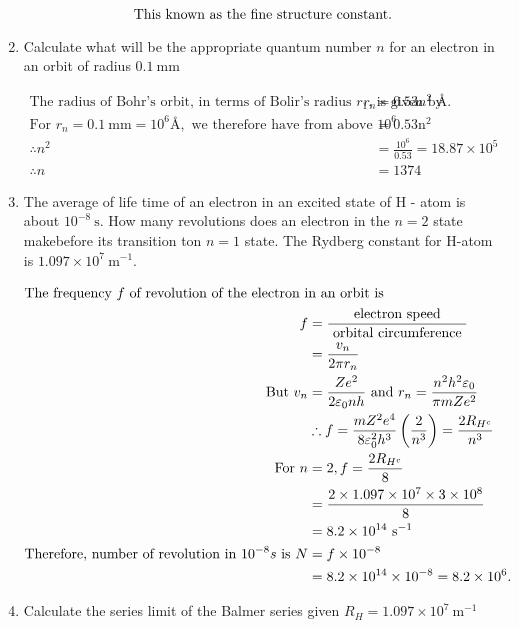\begin{enumerate}[ label=\color{ocre}\textbf{\arabic*.}]
\begin{answer}
\begin{align*}
		\intertext{This known as the fine structure constant.}
		\end{align*}
	\end{answer}
	\item Calculate what will be the appropriate quantum number $n$ for an electron in an orbit of radius $0.1 \mathrm{~mm}$
	\begin{answer}
		\begin{align*}
		\text{The radius of Bohr's orbit, in terms of Bolir's radius $r_{1}$, is given by }r_{n}&=0.53 n^{2} \text{ \AA}.\\
		\text{For }r_{n}=0.1 \mathrm{~mm}=10^{6} \text{\AA},\text{ we therefore have from above } 10^{6}&=0.53 \mathrm{n}^2\\
		\therefore n^{2}&=\frac{10^{6}}{0.53}=18.87 \times 10^{5}\\
		\therefore n&=1374
		\end{align*}
	\end{answer}
	\item  The average of life time of an electron in an excited state of H - atom is about $10^{-8} \mathrm{~s}$. How many revolutions does an electron in the $n=2$ state makebefore its transition ton $n=1$ state. The Rydberg constant for H-atom is $1.097 \times 10^{7} \mathrm{~m}^{-1}$.
	\begin{answer}
		\begin{align*}
		\intertext{The frequency $f$ of revolution of the electron in an orbit is } f&=\frac{\text { electron speed }}{\text { orbital circumference }}\\&=\frac{v_{n}}{2 \pi r_{n}}\\
	\text{	But }v_{n}&=\frac{Z e^{2}}{2 \varepsilon_{0} n h}\text{ and }r_{n}=\frac{n^{2} h^{2} \varepsilon_{0}}{\pi m Z e^{2}}\\&\therefore f=\frac{m Z^{2} e^{4}}{8 \varepsilon_{0}^{2} h^{3}}\left(\frac{2}{n^{3}}\right)=\frac{2 R_{H^{c}}}{n^{3}}\\
	\text{	For }n&=2, f=\frac{2 R_{H^{c}}}{8}\\&=\frac{2 \times 1.097 \times 10^{7} \times 3 \times 10^{8}}{8}\\&=8.2 \times 10^{14} \mathrm{~s}^{-1}\\
	\text{Therefore, number of revolution in }10^{-8} s \text{ is }N&=f \times 10^{-8}\\&=8.2 \times 10^{14} \times 10^{-8}=8.2 \times 10^{6}.
		\end{align*}
	\end{answer}
	\item Calculate the series limit of the Balmer series given $R_{H}=1.097 \times 10^{7} \mathrm{~m}^{-1}$

\end{enumerate}
